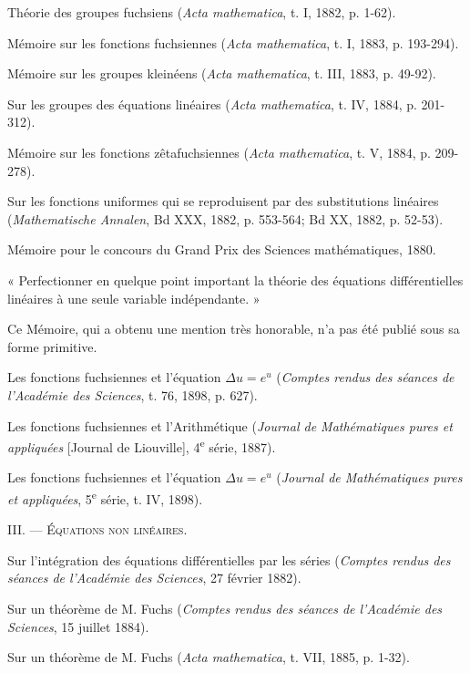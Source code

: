 \documentclass[11pt]{article}
\begin{document}
\begin{description}[leftmargin=3.4em,labelwidth=2.8em,style=nextline]
\item[65.] Théorie des groupes fuchsiens (\emph{Acta mathematica}, t. I, 1882, p. 1-62).
\item[66.] Mémoire sur les fonctions fuchsiennes (\emph{Acta mathematica}, t. I, 1883, p. 193-294).
\item[68.] Mémoire sur les groupes kleinéens (\emph{Acta mathematica}, t. III, 1883, p. 49-92).
\item[69.] Sur les groupes des équations linéaires (\emph{Acta mathematica}, t. IV, 1884, p. 201-312).
\item[70.] Mémoire sur les fonctions zêtafuchsiennes (\emph{Acta mathematica}, t. V, 1884, p. 209-278).
\item[101.] Sur les fonctions uniformes qui se reproduisent par des substitutions linéaires (\emph{Mathematische Annalen}, Bd XXX, 1882, p. 553-564; Bd XX, 1882, p. 52-53).
\item[104.] Mémoire pour le concours du Grand Prix des Sciences mathématiques, 1880.

« Perfectionner en quelque point important la théorie des équations différentielles linéaires à une seule variable indépendante. »

Ce Mémoire, qui a obtenu une mention très honorable, n’a pas été publié sous sa forme primitive.
\item[174.] Les fonctions fuchsiennes et l’équation $\Delta u=e^u$ (\emph{Comptes rendus des séances de l’Académie des Sciences}, t. 76, 1898, p. 627).
\item[191.] Les fonctions fuchsiennes et l’Arithmétique (\emph{Journal de Mathématiques pures et appliquées} [Journal de Liouville], 4\textsuperscript{e} série, 1887).
\item[197.] Les fonctions fuchsiennes et l’équation $\Delta u=e^u$ (\emph{Journal de Mathématiques pures et appliquées}, 5\textsuperscript{e} série, t. IV, 1898).
\end{description}

\begin{center}
{\scshape III. — Équations non linéaires.}
\end{center}

\begin{description}[leftmargin=3.4em,labelwidth=2.8em,style=nextline]
\item[24.] Sur l’intégration des équations différentielles par les séries (\emph{Comptes rendus des séances de l’Académie des Sciences}, 27 février 1882).
\item[48.] Sur un théorème de M. Fuchs (\emph{Comptes rendus des séances de l’Académie des Sciences}, 15 juillet 1884).
\item[71.] Sur un théorème de M. Fuchs (\emph{Acta mathematica}, t. VII, 1885, p. 1-32).
\end{description}
\end{document}
